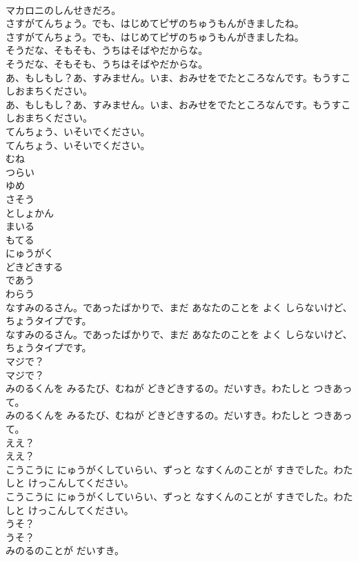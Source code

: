 \documentclass[8pt]{extreport}
\begin{document}
\begin{CJK}{UTF8}{min}
\\	マカロニのしんせきだろ。
\\	さすがてんちょう。でも、はじめてピザのちゅうもんがきましたね。
\\	さすがてんちょう。でも、はじめてピザのちゅうもんがきましたね。
\\	そうだな、そもそも、うちはそばやだからな。
\\	そうだな、そもそも、うちはそばやだからな。
\\	あ、もしもし？あ、すみません。いま、おみせをでたところなんです。もうすこしおまちください。
\\	あ、もしもし？あ、すみません。いま、おみせをでたところなんです。もうすこしおまちください。
\\	てんちょう、いそいでください。
\\	てんちょう、いそいでください。
\\	むね
\\	つらい
\\	ゆめ
\\	さそう
\\	としょかん
\\	まいる
\\	もてる
\\	にゅうがく
\\	どきどきする
\\	であう
\\	わらう
\\	なすみのるさん。であったばかりで、まだ あなたのことを よく しらないけど、ちょうタイプです。
\\	なすみのるさん。であったばかりで、まだ あなたのことを よく しらないけど、ちょうタイプです。
\\	マジで？
\\	マジで？
\\	みのるくんを みるたび、むねが どきどきするの。だいすき。わたしと つきあって。
\\	みのるくんを みるたび、むねが どきどきするの。だいすき。わたしと つきあって。
\\	ええ？
\\	ええ？
\\	こうこうに にゅうがくしていらい、ずっと なすくんのことが すきでした。わたしと けっこんしてください。
\\	こうこうに にゅうがくしていらい、ずっと なすくんのことが すきでした。わたしと けっこんしてください。
\\	うそ？
\\	うそ？
\\	みのるのことが だいすき。

\end{CJK}
\end{document}
